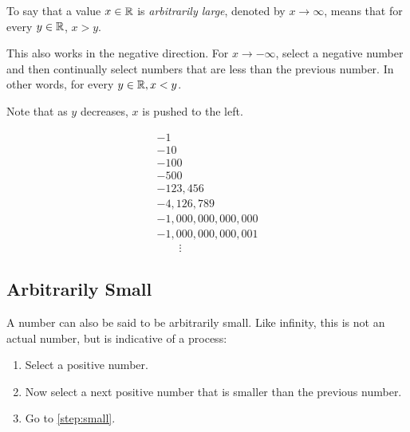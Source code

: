 \documentclass[letterpaper,12pt,fleqn]{article}
\begin{document}
\begin{definition}
  To say that a value \(x\in\mathbb{R}\) is \emph{arbitrarily large}, denoted by \(x\to\infty\), means that for every
  \(y\in\mathbb{R}\), \(x>y\).
\end{definition}

This also works in the negative direction.  For \(x\to-\infty\), select a negative number and then continually
select numbers that are less than the previous number.  In other words, for every \(y\in\mathbb{R},x<y\).

\bigskip

\begin{center}
\end{center}

Note that as \(y\) decreases, \(x\) is pushed to the left.

\begin{example}
  \[\begin{array}{l}
  -1 \\
  -10 \\
  -100 \\
  -500 \\
  -123,456 \\
  -4,126,789 \\
  -1,000,000,000,000 \\
  -1,000,000,000,001 \\
  \qquad\vdots
  \end{array}\]
\end{example}

\subsection*{Arbitrarily Small}

A number can also be said to be arbitrarily small.  Like infinity, this is not an actual number, but is indicative
of a process:

\begin{enumerate}
\item Select a positive number.
\item\label{step:small} Now select a next positive number that is smaller than the previous number.
\item Go to \ref{step:small}.
\end{enumerate}
\end{document}
